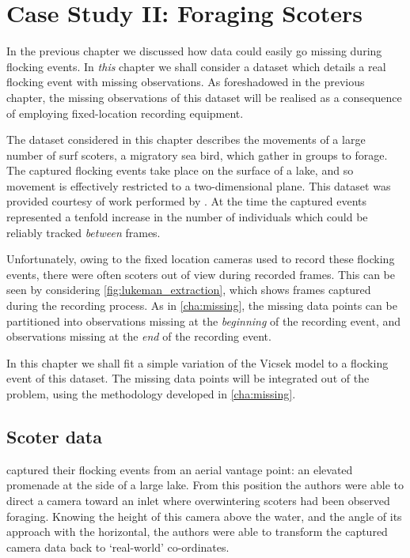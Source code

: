 \graphicspath{{fig/scoters/}}

\chapter{Case Study II: Foraging Scoters}
\label{cha:scoters}

In the previous chapter we discussed how data could easily go missing during
flocking events. In \emph{this} chapter we shall consider a dataset which
details a real flocking event with missing observations. As foreshadowed in the
previous chapter, the missing observations of this dataset will be realised as
a consequence of employing fixed-location recording equipment.

The dataset considered in this chapter describes the movements of a large
number of surf scoters, a migratory sea bird, which gather in groups to forage.
The captured flocking events take place on the surface of a lake, and so
movement is effectively restricted to a two-dimensional plane. This dataset was
provided courtesy of work performed by \textcite{lukeman09,lukeman10}. At the
time the captured events represented a tenfold increase in the number of
individuals which could be reliably tracked \emph{between} frames.

Unfortunately, owing to the fixed location cameras used to record these
flocking events, there were often scoters out of view during recorded frames.
This can be seen by considering \cref{fig:lukeman_extraction}, which shows
frames captured during the recording process. As in \cref{cha:missing}, the
missing data points can be partitioned into observations missing at the
\emph{beginning} of the recording event, and observations missing at the
\emph{end} of the recording event.

In this chapter we shall fit a simple variation of the Vicsek model to a
flocking event of this dataset. The missing data points will be integrated out
of the problem, using the methodology developed in \cref{cha:missing}.

\section{Scoter data}

\textcite{lukeman10} captured their flocking events from an aerial vantage
point: an elevated promenade at the side of a large lake. From this position
the authors were able to direct a camera toward an inlet where overwintering
scoters had been observed foraging. Knowing the height of this camera above the
water, and the angle of its approach with the horizontal, the authors were able
to transform the captured camera data back to `real-world' co-ordinates.

